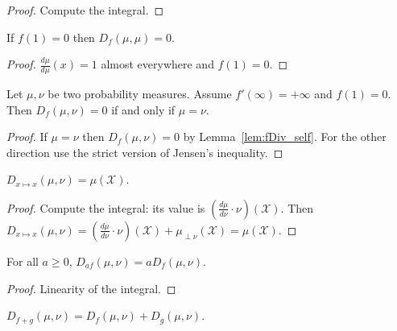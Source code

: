 \begin{proof} \leanok
Compute the integral.
\end{proof}

\begin{lemma}
  \label{lem:fDiv_self}
  \leanok
  If $f(1) = 0$ then $D_{f}(\mu, \mu) = 0$.
\end{lemma}

\begin{proof} \leanok
$\frac{d \mu}{d \mu}(x) = 1$ almost everywhere and $f(1) = 0$.
\end{proof}


\begin{lemma}
  \label{lem:fDiv_eq_zero_iff}
  \leanok
  Let $\mu, \nu$ be two probability measures. Assume $f'(\infty) = + \infty$ and $f(1) = 0$. Then $D_f(\mu, \nu) = 0$ if and only if $\mu = \nu$.
\end{lemma}

\begin{proof}\leanok
{}
If $\mu = \nu$ then $D_f(\mu, \nu) = 0$ by Lemma~\ref{lem:fDiv_self}.
For the other direction use the strict version of Jensen's inequality.
\end{proof}


\begin{lemma}
  \label{lem:fDiv_id}
  \leanok
  $D_{x \mapsto x}(\mu, \nu) = \mu(\mathcal X)$.
\end{lemma}

\begin{proof} \leanok
Compute the integral: its value is $(\frac{d\mu}{d\nu}\cdot \nu)(\mathcal X)$. Then
$D_{x\mapsto x}(\mu, \nu) = (\frac{d\mu}{d\nu}\cdot \nu)(\mathcal X) + \mu_{\perp \nu}(\mathcal X) = \mu (\mathcal X)$.
\end{proof}

\begin{lemma}
  \label{lem:fDiv_mul}
  \leanok
  For all $a \ge 0$, $D_{a f}(\mu, \nu) = a D_{f}(\mu, \nu)$.
\end{lemma}

\begin{proof}\leanok
Linearity of the integral.
\end{proof}

\begin{lemma}
  \label{lem:fDiv_add}
  \leanok
  $D_{f + g}(\mu, \nu) = D_f(\mu, \nu) + D_g(\mu, \nu)$.
\end{lemma}

